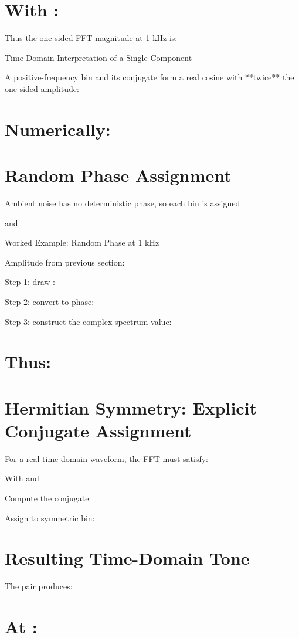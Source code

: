 \documentclass[12pt]{article}
\begin{document}
\section*{With :}

Thus the one-sided FFT magnitude at 1 kHz is:


Time-Domain Interpretation of a Single Component

A positive-frequency bin and its conjugate form a real cosine with **twice** the one-sided amplitude:


\section*{Numerically:}

\section*{Random Phase Assignment}
Ambient noise has no deterministic phase, so each bin is assigned


and


Worked Example: Random Phase at 1 kHz

Amplitude from previous section:


Step 1: draw :


Step 2: convert to phase:


Step 3: construct the complex spectrum value:


\section*{Thus:}

\section*{Hermitian Symmetry: Explicit Conjugate Assignment}
For a real time-domain waveform, the FFT must satisfy:


With  and :


Compute the conjugate:


Assign to symmetric bin:


\section*{Resulting Time-Domain Tone}
The pair  produces:


\section*{At :}
\end{document}
